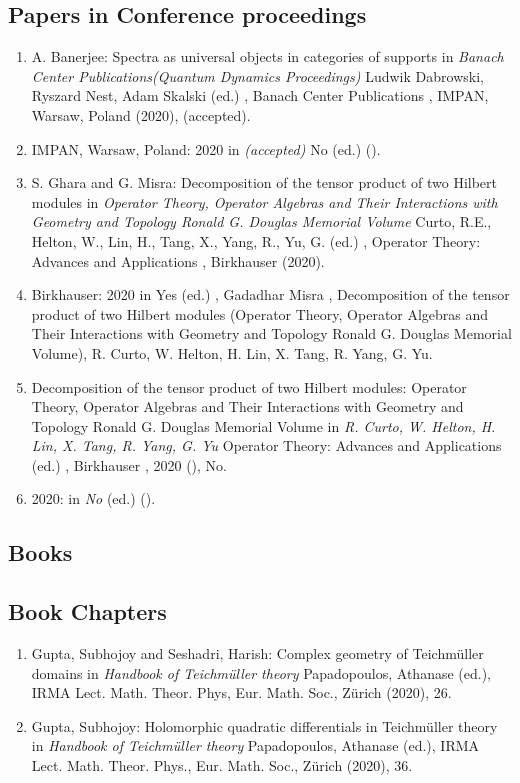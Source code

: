 \subsection{Papers in Conference proceedings}

\begin{enumerate}
\item A. Banerjee: Spectra as universal objects in categories of supports in {\em Banach Center Publications(Quantum Dynamics Proceedings)} Ludwik Dabrowski, Ryszard Nest, Adam Skalski (ed.) , Banach Center Publications , IMPAN, Warsaw, Poland (2020), (accepted).
\item IMPAN, Warsaw, Poland: 2020 in {\em (accepted)} No (ed.)   ().
\item S. Ghara and G. Misra: Decomposition of the tensor product of two Hilbert modules in {\em Operator Theory, Operator Algebras and Their Interactions with Geometry and Topology Ronald G. Douglas Memorial Volume} Curto, R.E., Helton, W., Lin, H., Tang, X., Yang, R., Yu, G. (ed.) , Operator Theory: Advances and Applications , Birkhauser (2020).
\item Birkhauser: 2020 in {\em } Yes (ed.) , Gadadhar Misra , Decomposition of the tensor product of two Hilbert modules (Operator Theory, Operator Algebras and Their Interactions with Geometry and Topology Ronald G. Douglas Memorial Volume), R. Curto, W. Helton, H. Lin, X. Tang, R. Yang, G. Yu.
\item Decomposition of the tensor product of two Hilbert modules: Operator Theory, Operator Algebras and Their Interactions with Geometry and Topology Ronald G. Douglas Memorial Volume in {\em R. Curto, W. Helton, H. Lin, X. Tang, R. Yang, G. Yu} Operator Theory: Advances and Applications (ed.) , Birkhauser , 2020 (), No.
\item 2020:  in {\em No}  (ed.)   ().
\end{enumerate}


\subsection{Books}



\subsection{Book Chapters}

\begin{enumerate}
\item Gupta, Subhojoy and Seshadri, Harish: Complex geometry of Teichmüller domains in {\em Handbook of Teichmüller theory} Papadopoulos, Athanase (ed.), IRMA Lect. Math. Theor. Phys, Eur. Math. Soc., Zürich (2020), 26.
\item Gupta, Subhojoy: Holomorphic quadratic differentials in Teichmüller theory in {\em Handbook of Teichmüller theory} Papadopoulos, Athanase (ed.), IRMA Lect. Math. Theor. Phys., Eur. Math. Soc., Zürich (2020), 36.
\end{enumerate}


